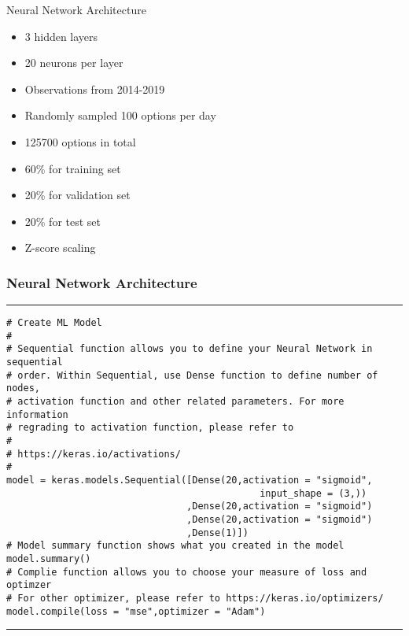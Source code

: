 \documentclass[11pt]{beamer}
\begin{document}
\begin{frame}{Neural Network Architecture}
\begin{itemize}
\item 3 hidden layers
\item 20 neurons per layer
\item Observations from 2014-2019
\item Randomly sampled 100 options per day
\item 125700 options in total
\item 60\% for training set
\item 20\% for validation set
\item 20\% for test set
\item Z-score scaling
\end{itemize}
\end{frame}
\begin{frame}[fragile]
\frametitle{Neural Network Architecture}
\rule{\textwidth}{1pt}
\scriptsize
\begin{verbatim}
# Create ML Model
#
# Sequential function allows you to define your Neural Network in sequential 
# order. Within Sequential, use Dense function to define number of nodes, 
# activation function and other related parameters. For more information 
# regrading to activation function, please refer to 
#
# https://keras.io/activations/
#
model = keras.models.Sequential([Dense(20,activation = "sigmoid",
                                             input_shape = (3,))
                                ,Dense(20,activation = "sigmoid")
                                ,Dense(20,activation = "sigmoid")
                                ,Dense(1)])
# Model summary function shows what you created in the model
model.summary()
# Complie function allows you to choose your measure of loss and optimzer
# For other optimizer, please refer to https://keras.io/optimizers/
model.compile(loss = "mse",optimizer = "Adam")
\end{verbatim}
\rule{\textwidth}{1pt}
\end{frame}
\end{document}
